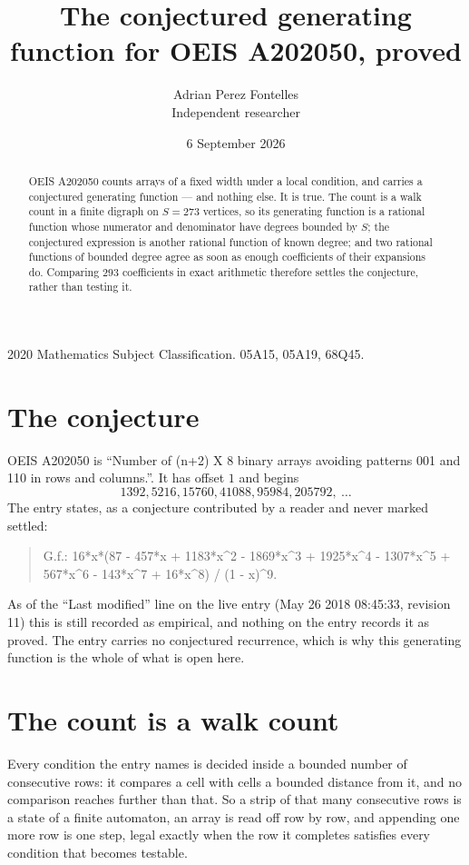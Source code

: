 \documentclass[11pt,a4paper]{article}
\title{The conjectured generating function for OEIS A202050, proved}
\author{Adrian Perez Fontelles\\ \small Independent researcher}
\date{6 September 2026}
\theoremstyle{plain}
\theoremstyle{definition}
\begin{document}
\maketitle

\begin{abstract}
OEIS A202050 counts arrays of a fixed width under a local condition, and carries a conjectured
generating function --- and nothing else. It is true. The count is a walk count in a finite
digraph on $S=273$ vertices, so its generating function is a rational function whose numerator
and denominator have degrees bounded by $S$; the conjectured expression is another rational
function of known degree; and two rational functions of bounded degree agree as soon as enough
coefficients of their expansions do. Comparing $293$ coefficients in exact arithmetic
therefore settles the conjecture, rather than testing it.
\end{abstract}

\noindent\small 2020 Mathematics Subject Classification. 05A15, 05A19, 68Q45.\normalsize

\section{The conjecture}

OEIS A202050 is ``Number of (n+2) X 8 binary arrays avoiding patterns 001 and 110 in rows and columns.''. It has offset $1$ and begins
\[
1392, 5216, 15760, 41088, 95984, 205792,\ \dots
\]
The entry states, as a conjecture contributed by a reader and never marked settled:
\begin{quote}
G.f.: 16*x*(87 - 457*x + 1183*x\^{}2 - 1869*x\^{}3 + 1925*x\^{}4 - 1307*x\^{}5 + 567*x\^{}6 - 143*x\^{}7 + 16*x\^{}8) / (1 - x)\^{}9.
\end{quote}
As of the ``Last modified'' line on the live entry (May 26 2018 08:45:33, revision 11) this is still
recorded as empirical, and nothing on the entry records it as proved. The entry carries no
conjectured recurrence, which is why this generating function is the whole of what is open
here.

\section{The count is a walk count}

Every condition the entry names is decided inside a bounded number of consecutive rows: it
compares a cell with cells a bounded distance from it, and no comparison reaches further than
that. So a strip of that many consecutive rows is a state of a finite automaton, an array is
read off row by row, and appending one more row is one step, legal exactly when the row it
completes satisfies every condition that becomes testable.
\end{document}
